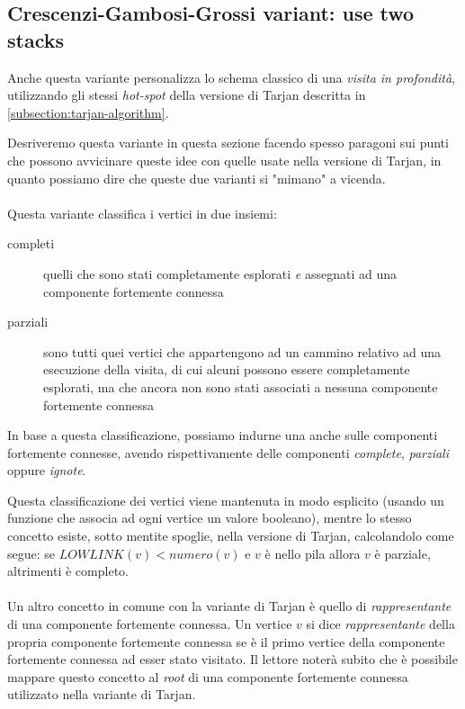\subsection{Crescenzi-Gambosi-Grossi variant: use two stacks}
\label{subsection:crescenzi-gambosi-grossi}
Anche questa variante personalizza lo schema classico di una
\emph{visita in profondit\`a}, utilizzando gli stessi \emph{hot-spot}
della versione di Tarjan descritta in
\ref{subsection:tarjan-algorithm}. 

Desriveremo questa variante in questa sezione facendo spesso paragoni
sui punti che possono avvicinare queste idee con quelle usate nella
versione di Tarjan, in quanto possiamo dire che queste due varianti si
"mimano" a vicenda.
\\\\
Questa variante classifica i vertici in due insiemi:
\begin{description}
\item[completi] quelli che sono stati completamente esplorati \emph{e}
  assegnati ad una componente fortemente connessa
\item[parziali] sono tutti quei vertici che appartengono ad un cammino
  relativo ad una esecuzione della visita, di cui alcuni possono
  essere completamente esplorati, ma che ancora non sono stati
  associati a nessuna componente fortemente connessa
\end{description}
In base a questa classificazione, possiamo indurne una anche sulle
componenti fortemente connesse, avendo rispettivamente delle
componenti \emph{complete}, \emph{parziali} oppure \emph{ignote}.

Questa classificazione dei vertici viene mantenuta in modo esplicito
(usando un funzione che associa ad ogni vertice un valore booleano),
mentre lo stesso concetto esiste, sotto mentite spoglie, nella
versione di Tarjan, calcolandolo come segue: se $LOWLINK(v) <
numero(v)$ e $v$ \`e nello pila allora $v$ \`e parziale, altrimenti
\`e completo.
\\\\
Un altro concetto in comune con la variante di Tarjan \`e quello di
\emph{rappresentante} di una componente fortemente connessa. Un
vertice $v$ si dice \emph{rappresentante} della propria componente
fortemente connessa se \`e il primo vertice della componente
fortemente connessa ad esser stato visitato. Il lettore noter\`a
subito che \`e possibile mappare questo concetto al \emph{root} di una
componente fortemente connessa utilizzato nella variante di Tarjan.

